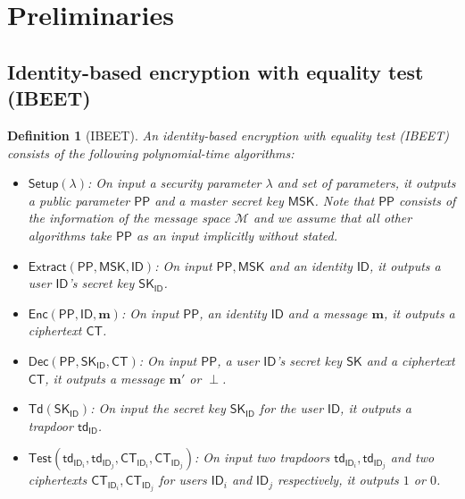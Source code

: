 \documentclass[runningheads]{llncs}
\newtheorem{defn}[thm]{Definition}
\def\cal{\mathcal}
\def\bf{\mathbf}
\def\SK{\mathsf{SK}}
\def\PP{\mathsf{PP}}
\def\MSK{\mathsf{MSK}}
\def\CT{\mathsf{CT}}
\def\td{\mathsf{td}}
\def\Setup{\mathsf{Setup}}
\def\Enc{\mathsf{Enc}}
\def\Extract{\mathsf{Extract}}
\def\Dec{\mathsf{Dec}}
\def\Td{\mathsf{Td}}
\def\Test{\mathsf{Test}}
\def\ID{\mathsf{ID}}
\begin{document}
	
	
	\section{Preliminaries}\label{sec:prelim}
	\subsection{Identity-based encryption with equality test (IBEET)}
	
	
	\begin{defn}[IBEET] \label{def:PKEET}
		An identity-based encryption with equality test (IBEET) consists of the following polynomial-time algorithms:
		\begin{itemize}
			\item $\Setup(\lambda)$: On input a security parameter $\lambda$ and set of parameters, it outputs a public parameter $\PP$ and a master secret key $\MSK$. Note that $\PP$ consists of the information of the message space $\cal{M}$ and we assume that all other algorithms take $\PP$ as an input implicitly without stated.
			\item $\Extract(\PP,\MSK,\ID)$: On input $\PP, \MSK$ and an identity $\ID$, it outputs a user $\ID$'s secret key $\SK_{\ID}$.
			\item $\Enc(\PP,\ID,\bf{m})$: On input  $\PP$, an identity $\ID$ and a message $\bf{m}$, it outputs a ciphertext $\CT$.
			\item $\Dec(\PP,\SK_{\ID},\CT)$: On input $\PP$, a user $\ID$'s secret key $\SK$ and a ciphertext $\CT$, it outputs a message $\bf{m}'$ or $\perp$.
			\item $\Td(\SK_{\ID})$: On input the secret key $\SK_{\ID}$ for the user $\ID$, it outputs a trapdoor $\td_{\ID}$.
			\item $\Test(\td_{\ID_i},\td_{\ID_j},\CT_{\ID_i},\CT_{\ID_j})$: On input two trapdoors $\td_{\ID_i}, \td_{\ID_j}$ and two ciphertexts $\CT_{\ID_i}, \CT_{\ID_j}$ for users $\ID_i$ and $\ID_j$ respectively, it outputs $1$ or $0$.
		\end{itemize}    
	\end{defn}
	
\end{document}
